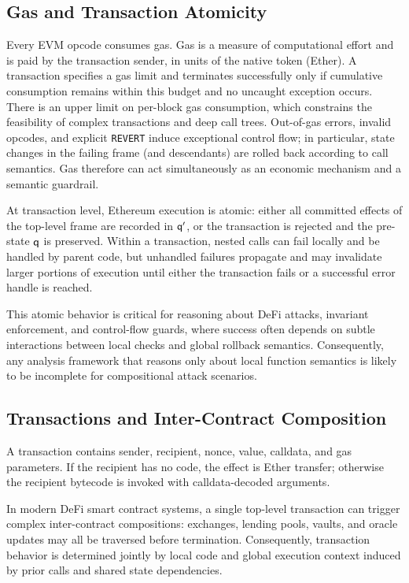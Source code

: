 \subsection{Gas and Transaction Atomicity}
Every EVM opcode consumes gas. Gas is a measure of
computational effort and is paid by the transaction sender,
in units of the native token (Ether).
 A transaction specifies
a gas limit and terminates successfully only if
cumulative consumption remains within this budget
and no uncaught exception occurs.
There is an upper limit on
per-block gas consumption, which constrains the
feasibility of complex transactions and deep call trees.
Out-of-gas errors, invalid opcodes, and
explicit \texttt{REVERT} induce exceptional
control flow; in particular, state changes
in the failing frame (and descendants) are
rolled back according to call semantics.
Gas therefore can act simultaneously as an economic
mechanism and a semantic guardrail.

At transaction level, Ethereum execution
is atomic: either all committed effects of
the top-level frame are recorded in $\mathsf{q}'$,
or the transaction is rejected and the pre-state $\mathsf{q}$
is preserved. Within a transaction,
nested calls can fail locally and be handled by parent
code, but unhandled failures propagate and may
invalidate larger portions of execution until either
the transaction fails or a successful error handle is reached.

This atomic behavior is critical for
reasoning about DeFi attacks, invariant
enforcement, and control-flow guards, where success
often depends on subtle interactions between local
checks and global rollback semantics.
Consequently, any analysis framework that
reasons only about local function semantics
is likely to be incomplete for compositional
attack scenarios.

\subsection{Transactions and Inter-Contract Composition}
A transaction contains sender, recipient, nonce,
value, calldata, and gas parameters. If the
recipient has no code, the effect is Ether
transfer; otherwise the recipient bytecode
is invoked with calldata-decoded arguments.

In modern DeFi smart contract systems, a single top-level
transaction can trigger complex inter-contract
compositions: exchanges, lending pools,
vaults, and oracle updates may all be traversed
before termination. Consequently, transaction
behavior is determined jointly by local code and global
execution context induced by prior calls and shared
state dependencies.


